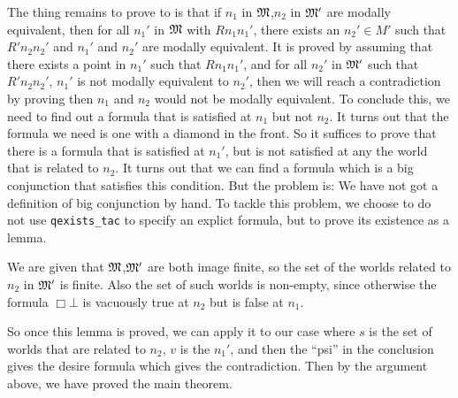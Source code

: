 \documentclass[letterpaper]{article}
\renewcommand{\HOLinline}[1]{\ensuremath{#1}}
\begin{document}
The thing remains to prove to is that if $n_1$ in \HOLinline{\HOLFreeVar{\ensuremath{\mathfrak{M}}}},$n_2$ in \HOLinline{\HOLFreeVar{\ensuremath{\mathfrak{M}'}}} are modally equivalent, then for all $n_1'$ in \HOLinline{\HOLFreeVar{\ensuremath{\mathfrak{M}}}} with $Rn_1n_1'$, there exists an $n_2'\in M'$ such that $R'n_2n_2'$ and $n_1'$ and $n_2'$ are modally equivalent. It is proved by assuming that there exists a point in $n_1'$ such that $Rn_1n_1'$, and for all $n_2'$ in \HOLinline{\HOLFreeVar{\ensuremath{\mathfrak{M}'}}} such that $R'n_2n_2'$, $n_1'$ is not modally equivalent to $n_2'$, then we will reach a contradiction by proving then $n_1$ and $n_2$ would not be modally equivalent. To conclude this, we need to find out a formula that is satisfied at $n_1$ but not $n_2$. It turns out that the formula we need is one with a diamond in the front. So it suffices to prove that there is a formula that is satisfied at $n_1'$, but is not satisfied at any the world that is related to $n_2$. It turns out that we can find a formula which is a big conjunction that satisfies this condition. But the problem is: We have not got a definition of big conjunction by hand. To tackle this problem, we choose to do not use \texttt{qexists_tac} to specify an explict formula, but to prove its existence as a lemma.


We are given that \HOLinline{\HOLFreeVar{\ensuremath{\mathfrak{M}}}},\HOLinline{\HOLFreeVar{\ensuremath{\mathfrak{M}'}}} are both image finite, so the set of the worlds related to $n_2$ in \HOLinline{\HOLFreeVar{\ensuremath{\mathfrak{M}'}}} is finite. Also the set of such worlds is non-empty, since otherwise the formula $\Box \bot$ is vacuously true at $n_2$ but is false at $n_1$. 

So once this lemma is proved, we can apply it to our case where $s$ is the set of worlds that are related to $n_2$, $v$ is the $n_1'$, and then the ``psi'' in the conclusion gives the desire formula which gives the contradiction. Then by the argument above, we have proved the main theorem.
                 
\end{document}
